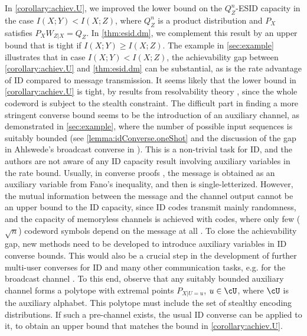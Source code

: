 \documentclass[conference,final]{IEEEtran}
\begin{document}
In \cref{corollary:achiev.U}, we improved the lower bound on the
$Q_Z^n$-ESID capacity in the case $I(X; Y) < I(X; Z)$,
where $Q_Z^n$ is a product distribution and $P_X$
satisfies $P_X W_{Z|X} = Q_Z$.
In \cref{thm:esid.dm}, we complement this result by an upper bound
that is tight if $I(X; Y) \ge I(X; Z)$.
The example in \cref{sec:example} illustrates that
in case $I(X; Y) < I(X; Z)$,
the achievability gap between
\cref{corollary:achiev.U} and \cref{thm:esid.dm}
can be substantial, as is the rate advantage of ID
compared to message transmission.
It seems likely that the lower bound in \cref{corollary:achiev.U}
is tight, by results from resolvability theory \cite{HouKramer2013divergence},
since the whole codeword is subject to the stealth constraint.
The difficult part in finding a more stringent converse bound
seems to be the introduction of an auxiliary channel, as
demonstrated in \cref{sec:example}, where the number of possible input
sequences is suitably bounded (see \cref{lemma:idConverse.oneShot}
and the discussion of the gap in Ahlswede's broadcast converse in \cite[Section~2.4]{Bracher2016IdentificationZeroError_phd}).
This is a non-trivial task for ID,
and the authors are not aware of any ID capacity result
involving auxiliary variables in the rate bound.
Usually, in converse proofs \cite{ElGamalKim2011NetworkInformationTheory},
the message is obtained as an auxiliary variable from Fano's inequality,
and then is single-letterized.
However, the mutual information between the message and the channel output
cannot be an upper bound to the ID capacity,
since  ID codes transmit mainly randomness, and the capacity of memoryless
channels is achieved with codes, where only few ($\sqrt{n}$) codeword symbols depend
on the message at all \cite{AhlswedeDueck1989Identificationpresencefeedback}.
To close the achievability gap, new methods need to be developed
to introduce auxiliary variables in ID converse bounds.
This would also be a crucial step in the development of further multi-user converses
for ID and many other communication tasks\cite{Ahlswede2008Generaltheoryinformation,Ahlswede2021IdenticationOtherProbabilistic},
e.g. for the broadcast channel \cite{Ahlswede2008Generaltheoryinformation,Bracher2016IdentificationZeroError_phd}.
To this end, observe that any suitably bounded auxiliary channel forms a polytope
with extremal points $P_{X|U=u}$, $u \in \cU$,
where $\cU$ is the auxiliary alphabet.
This polytope must include the set of stealthy encoding distributions.
If such a pre-channel exists,
the usual ID converse can be applied to it, to obtain an upper bound
that matches the bound in \cref{corollary:achiev.U}.
\end{document}
